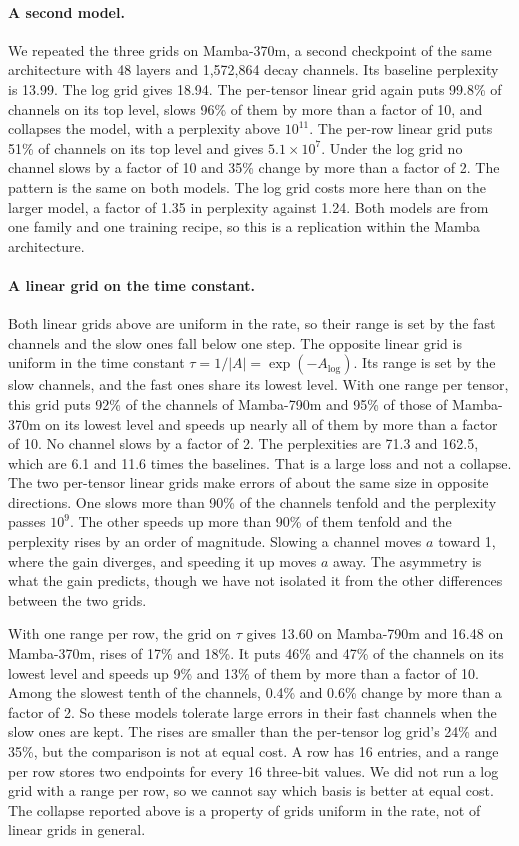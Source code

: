 \documentclass[10pt]{article}
\begin{document}
\paragraph{A second model.} We repeated the three grids on Mamba-370m, a second checkpoint of
the same architecture with 48 layers and 1{,}572{,}864 decay channels. Its baseline perplexity is
13.99. The log grid gives 18.94. The per-tensor linear grid again puts 99.8\% of channels on its
top level, slows 96\% of them by more than a factor of 10, and collapses the model, with a
perplexity above $10^{11}$. The per-row linear grid puts 51\% of channels on its top level and
gives $5.1\times10^{7}$. Under the log grid no channel slows by a factor of 10 and 35\% change by
more than a factor of 2. The pattern is the same on both models. The log grid costs more here
than on the larger model, a factor of 1.35 in perplexity against 1.24. Both models are from one
family and one training recipe, so this is a replication within the Mamba architecture.

\paragraph{A linear grid on the time constant.} Both linear grids above are uniform in the rate,
so their range is set by the fast channels and the slow ones fall below one step. The opposite
linear grid is uniform in the time constant $\tau = 1/|A| = \exp(-A_{\log})$. Its range is set by
the slow channels, and the fast ones share its lowest level. With one range per tensor, this grid
puts 92\% of the channels of Mamba-790m and 95\% of those of Mamba-370m on its lowest level and
speeds up nearly all of them by more than a factor of 10. No channel slows by a factor of 2. The
perplexities are 71.3 and 162.5, which are 6.1 and 11.6 times the baselines. That is a large
loss and not a collapse. The two per-tensor linear grids make errors of about the same size in
opposite directions. One slows more than 90\% of the channels tenfold and the perplexity passes
$10^{9}$. The other speeds up more than 90\% of them tenfold and the perplexity rises by an order
of magnitude. Slowing a channel moves $a$ toward 1, where the gain diverges, and speeding it up
moves $a$ away. The asymmetry is what the gain predicts, though we have not isolated it from the
other differences between the two grids.

With one range per row, the grid on $\tau$ gives 13.60 on Mamba-790m and 16.48 on Mamba-370m,
rises of 17\% and 18\%. It puts 46\% and 47\% of the channels on its lowest level and speeds up
9\% and 13\% of them by more than a factor of 10. Among the slowest tenth of the channels, 0.4\%
and 0.6\% change by more than a factor of 2. So these models tolerate large errors in their fast
channels when the slow ones are kept. The rises are smaller than the per-tensor log grid's 24\%
and 35\%, but the comparison is not at equal cost. A row has 16 entries, and a range per row
stores two endpoints for every 16 three-bit values. We did not run a log grid with a range per
row, so we cannot say which basis is better at equal cost. The collapse reported above is a
property of grids uniform in the rate, not of linear grids in general.
\end{document}
